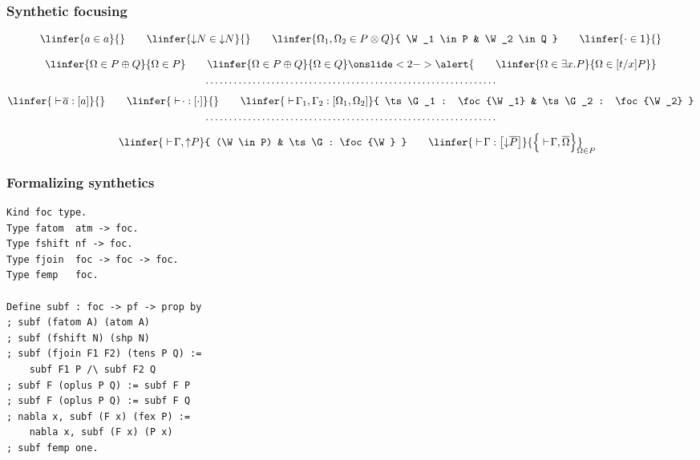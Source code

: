 \documentclass{beamer}
\begin{document}
\begin{frame}
  \frametitle{Synthetic focusing}

  \begin{gather*}
    \linfer{
      a \in a \mathstrut
    }{}
    \qquad
    \linfer{
      \SHP N \in \SHP N
    }{}
    \qquad
    \linfer{
      \W_1, \W_2 \in P \TENS Q
    }{
      \W_1 \in P & \W_2 \in Q
    }
    \qquad
    \linfer{
      \cdot \in \ONE
    }{}
    \\[2ex]
    \linfer{
      \W \in P \PLUS Q
    }{
      \W \in P
    }
    \qquad
    \linfer{
      \W \in P \PLUS Q
    }{
      \W \in Q
    }
\onslide<2->{\alert{
    \qquad
    \linfer{
      \W \in \exists x. P
    }{
      \W \in [t/x] P
    }
}}
    \\
    \hbox to .8\linewidth{\dotfill}
    \\[1ex]
    \linfer{
      \ts \dual a : \foc{a}
    }{}
    \qquad
    \linfer{
      \ts \cdot : \foc{\cdot}
    }{}
    \qquad
    \linfer{
      \ts \G_1, \G_2 : \foc{\W_1, \W_2}
    }{
      \ts \G_1 : \foc{\W_1}
      &
      \ts \G_2 : \foc{\W_2}
    }
    \\
    \hbox to .8\linewidth{\dotfill}
    \\[1ex]
    \linfer{
      \ts \G, \SHN P
    }{
      (\W \in P) & \ts \G : \foc{\W}
    }
    \qquad
    \linfer{
      \ts \G : \foc{\SHP \dual P}
    }{
      \Bigl\{{
        \ts \G, \dual \W
      }\Bigr\}_{\mathrlap{\W \in P}}
    }
  \end{gather*}
\end{frame}

\begin{frame}[fragile]
  \frametitle{Formalizing synthetics}

\begin{lstlisting}
Kind foc type.
Type fatom  atm -> foc.
Type fshift nf -> foc.
Type fjoin  foc -> foc -> foc.
Type femp   foc.

Define subf : foc -> pf -> prop by
; subf (fatom A) (atom A)
; subf (fshift N) (shp N)
; subf (fjoin F1 F2) (tens P Q) :=
    subf F1 P /\ subf F2 Q
; subf F (oplus P Q) := subf F P
; subf F (oplus P Q) := subf F Q
; nabla x, subf (F x) (fex P) :=
    nabla x, subf (F x) (P x)
; subf femp one.
\end{lstlisting}
\end{frame}
\end{document}
